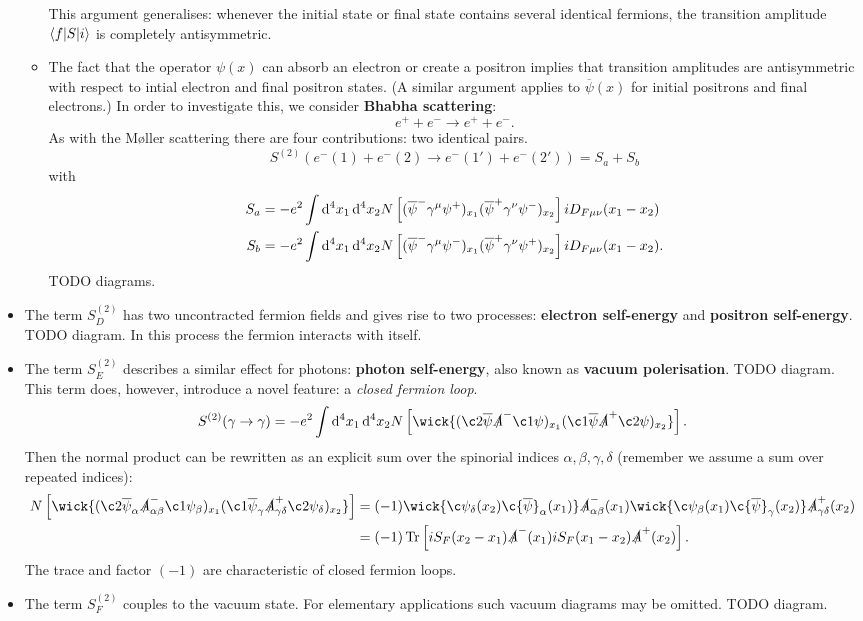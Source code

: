 \begin{itemize}
\begin{itemize}
This argument generalises: whenever the initial state or final state contains several identical fermions, the transition amplitude $\braket[S]{f}{i}$ is completely antisymmetric.
\item The fact that the operator $\psi(x)$ can absorb an electron or create a positron implies that transition amplitudes are antisymmetric with respect to intial electron and final positron states. (A similar argument applies to $\overline{\psi}(x)$ for initial positrons and final electrons.) In order to investigate this, we consider \textbf{Bhabha scattering}:
\[ e^+ + e^- \to e^+ + e^-. \]
As with the Møller scattering there are four contributions: two identical pairs.
\[ S^{(2)}(e^-(1) + e^-(2) \to e^-(1') + e^-(2')) = S_a + S_b \]
with
\begin{align*}
S_a &= -e^2\int \operatorname{d \!}{^4x_1}\operatorname{d \!}{^4x_2}N \left[(\overline{\psi}^-\gamma^\mu\psi^+)_{x_1}(\overline{\psi}^+\gamma^\nu\psi^-)_{x_2}\right]iD_{F\mu\nu}(x_1-x_2) \\
S_b &= -e^2\int \operatorname{d \!}{^4x_1}\operatorname{d \!}{^4x_2}N \left[(\overline{\psi}^-\gamma^\mu\psi^-)_{x_1}(\overline{\psi}^+\gamma^\nu\psi^+)_{x_2}\right]iD_{F\mu\nu}(x_1-x_2).
\end{align*}
TODO diagrams.
\end{itemize}
\item The term $S^{(2)}_D$ has two uncontracted fermion fields and gives rise to two processes: \textbf{electron self-energy} and \textbf{positron self-energy}. TODO diagram. In this process the fermion interacts with itself.
\item The term $S^{(2)}_E$ describes a similar effect for photons: \textbf{photon self-energy}, also known as \textbf{vacuum polerisation}. TODO diagram. This term does, however, introduce a novel feature: a \textit{closed fermion loop}.
\[ S^{(2)}(\gamma \to \gamma) = -e^2 \int \diff{^4x_1}\diff{^4x_2}N \left[\wick{(\c2{\overline{\psi}}\slashed{A}^-\c1\psi)_{x_1}(\c1{\overline{\psi}}\slashed{A}^+\c2\psi)_{x_2}}\right]. \]
Then the normal product can be rewritten as an explicit sum over the spinorial indices $\alpha, \beta, \gamma, \delta$ (remember we assume a sum over repeated indices):
\begin{align*}
N \left[\wick{(\c2{\overline{\psi}}_\alpha\slashed{A}^-_{\alpha\beta}\c1\psi_{\beta})_{x_1}(\c1{\overline{\psi}}_\gamma\slashed{A}^+_{\gamma\delta}\c2\psi_\delta)_{x_2}}\right] &= (-1)\wick{\c\psi_\delta(x_2)\c{\overline{\psi}}_\alpha(x_1)}\slashed{A}^-_{\alpha\beta}(x_1)\wick{\c\psi_\beta(x_1)\c{\overline{\psi}}_\gamma(x_2)}\slashed{A}^+_{\gamma\delta}(x_2) \\
&= (-1)\Tr \left[iS_F(x_2-x_1)\slashed{A}^-(x_1)iS_F(x_1-x_2)\slashed{A}^+(x_2)\right].
\end{align*}
The trace and factor $(-1)$ are characteristic of closed fermion loops.
\item The term $S^{(2)}_F$ couples to the vacuum state. For elementary applications such vacuum diagrams may be omitted. TODO diagram.
\end{itemize}

